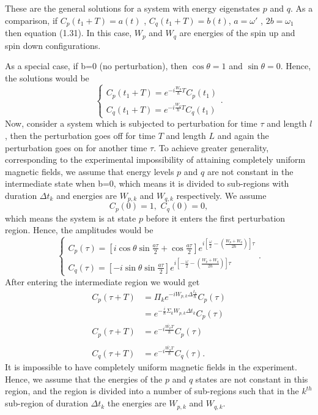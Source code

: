 These are the general solutions for a system with energy eigenstates
$p$ and $q$.
As a comparison, if $C_p(t_1+T)=a(t)$ ,
$C_q(t_1+T)=b(t)$, $a= \omega'$ , $2b=\omega_1$ then
equation (1.31). In this case, $W_p$ and $W_q$ are energies of the
spin up and spin down configurations.

As a special case, if b=0 (no perturbation), then $\cos \theta=1$ and
$\sin \theta=0$. Hence, the solutions would be
\begin{equation}
\left\lbrace
\begin{array}{c}
C_p(t_1+T)= e^{-i \frac{W_p}{\hbar} T} C_p(t_1) \\
C_q(t_1+T)=e^{-i \frac{W_q}{\hbar}T} C_q(t_1)
\end{array}
\right. .
\end{equation}
%
Now, consider a system which is subjected to perturbation for time
$\tau$ and length $l$, then the perturbation goes off for time $T$ and
length $L$ and again the perturbation goes on for another time
$\tau$. To achieve greater generality, corresponding to the
experimental impossibility of attaining completely uniform magnetic
fields, we assume that energy levels $p$ and $q$ are not constant in
the intermediate state when b=0, which means it is divided to
sub-regions with duration $\Delta t_k$ and energies are $W_{p,k}$ and
$W_{q,k}$ respectively. We assume
\begin{equation}
C_p(0)=1 , \, \, C_q(0)=0 ,
\end{equation}
which means the system is at state $p$ before it enters the first
perturbation region. Hence, the amplitudes would be
\begin{equation}
\left\lbrace
\begin{array}{c}
C_p(\tau)=\left[i \cos \theta \sin \frac{a\tau}{2}+ \cos \frac{a\tau}{2}\right]
e^{i\left[\frac{\omega}{2}-\left(\frac{W_p+W_q}{2\hbar}\right)\right]\tau}\\
C_q(\tau)=\left[ -i \sin \theta \sin \frac{a\tau}{2} \right] 
e^{i \left[ -\frac{\omega}{2} - \left( \frac{W_p+W_q}{2\hbar}\right)\right]\tau}
\end{array}\right. .
\end{equation}
After entering the intermediate region we would get
\begin{align}
C_p(\tau+T)&=\Pi_k e^{-i W_{p,k} \Delta \frac{t_k}{\hbar}}  C_p(\tau)\nonumber \\
&=e^{-\frac{i}{\hbar} \Sigma_k W_{p,k} \Delta t_k}  C_p(\tau) \nonumber\\
C_p(\tau+T)&=e^{-i \frac{\bar{W_p}T}{\hbar}} C_p(\tau) \\
\nonumber\\
C_q(\tau+T)&=e^{-i \frac{\bar{W_q}T}{\hbar}} C_q(\tau) .
\end{align}
%
It is impossible to have completely uniform magnetic fields in the
experiment. Hence, we assume that the energies of the $p$ and $q$
states are not constant in this region, and the region is divided into
a number of sub-regions such that in the $k^{th}$ sub-region of
duration $\Delta t_k$ the energies are $W_{p,k}$ and $W_{q,k}$.

